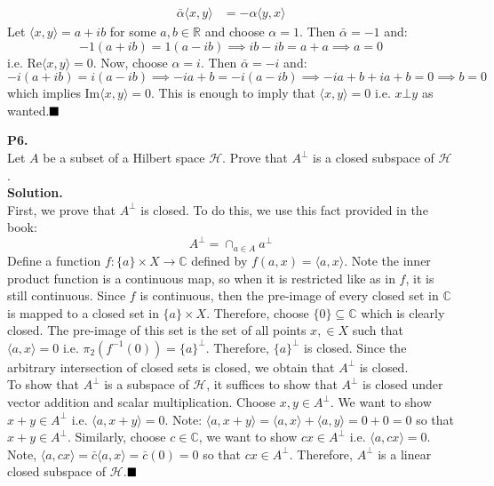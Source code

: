 \documentclass{article}
\begin{document}
\begin{enumerate}
\begin{align*}
                \bar{\alpha}\langle x,y\rangle &= -\alpha\langle y,x\rangle 
            \end{align*}
            Let $\langle x,y\rangle = a+ib$ for some $a,b\in\mathbb{R}$ and choose $\alpha = 1$. Then $\bar{\alpha} = -1$ and:
            \[ -1(a+ib) = 1(a-ib) \implies ib - ib = a + a \implies a = 0 \]
            i.e. Re$\langle x,y\rangle = 0$. Now, choose $\alpha = i$. Then $\bar{\alpha} = -i$ and:
            \[ -i(a+ib) = i(a-ib) \implies -ia + b = -i(a-ib) \implies -ia + b + ia + b = 0 \implies b = 0 \]
            which implies Im$\langle x,y\rangle = 0$. This is enough to imply that $\langle x,y\rangle = 0$ i.e. $x\bot y$ as 
            wanted.$\hfill\blacksquare$
    \end{enumerate}

    \newpage

    \textbf{P6.}\\

    Let $A$ be a subset of a Hilbert space $\mathcal{H}$. Prove that $A^{\bot}$ is a closed subspace of $\mathcal{H}$.\\

    \textbf{Solution.}\\

    First, we prove that $A^{\bot}$ is closed. To do this, we use this fact provided in the book:
    \[ A^{\bot} = \cap_{a\in A} a^{\bot} \]
    Define a function $f: \{a\} \times X \to \mathbb{C}$ defined by $f(a,x) = \langle a,x\rangle$. Note the inner product function
    is a continuous map, so when it is restricted like as in $f$, it is still continuous. Since $f$ is continuous, 
    then the pre-image of every closed set in $\mathbb{C}$ is
    mapped to a closed set in $\{a\}\times X$. Therefore, choose $\{0\}\subseteq\mathbb{C}$ which is clearly closed. The pre-image
    of this set is the set of all points $x,\in X$ such that $\langle a,x\rangle = 0$ i.e. $\pi_2(f^{-1}(0)) = \{a\}^{\bot}$.
    Therefore, $\{a\}^{\bot}$ is closed. Since the arbitrary intersection of closed sets is closed, we obtain that
    $A^{\bot}$ is closed.\\

    To show that $A^{\bot}$ is a subspace of $\mathcal{H}$, it suffices to show that $A^{\bot}$ is closed under vector addition
    and scalar multiplication. Choose $x,y\in A^{\bot}$. We want to show $x+y\in A^{\bot}$ i.e. $\langle a,x+y\rangle = 0$.
    Note: $\langle a,x+y\rangle = \langle a,x\rangle + \langle a,y\rangle = 0 + 0 = 0$ so that $x+y\in A^{\bot}$. Similarly,
    choose $c\in\mathbb{C}$, we want to show $cx\in A^{\bot}$ i.e. $\langle a,cx\rangle = 0$. Note,
    $\langle a,cx\rangle = \bar{c}\langle a,x\rangle = \bar{c}(0) = 0$ so that $cx\in A^{\bot}$. Therefore, $A^{\bot}$ is a linear
    closed subspace of $\mathcal{H}$.$\hfill\blacksquare$\\
\end{document}
